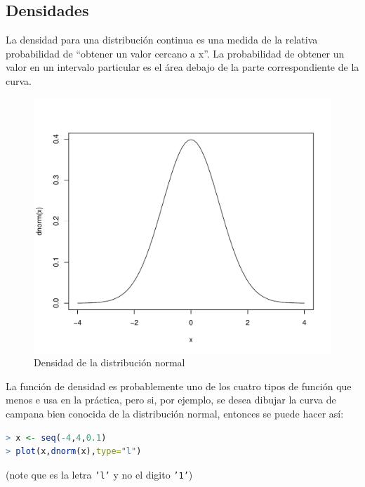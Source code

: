 \subsection{Densidades}

La densidad para una distribución continua es una medida de la relativa
probabilidad de ``obtener un valor cercano a x''. La probabilidad de obtener un
valor en un intervalo particular es el área debajo de la parte correspondiente
de la curva.

\newpage

\begin{figure}[H]
    \includegraphics[width=\linewidth]{img/fig-7.pdf}
    \caption{Densidad de la distribución normal}
    \label{fig:fig-7}
\end{figure}


La función de densidad es probablemente uno de los cuatro tipos de función que
menos e usa en la práctica, pero si, por ejemplo, se desea dibujar la curva de
campana bien conocida de la distribución normal, entonces se puede hacer así:

\begin{lstlisting}[language=R]
> x <- seq(-4,4,0.1)
> plot(x,dnorm(x),type="l")
\end{lstlisting}

(note que es la letra \texttt{'l'} y no el digito \texttt{'1'})

